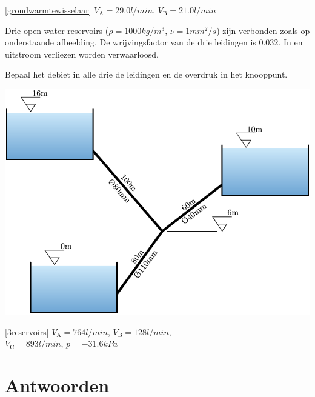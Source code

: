\begin{antwoord}{\ref{grondwarmtewisselaar}}
	$\dot{V}_\mathrm{A} = 29.0 \unit{l/min}$, $\dot{V}_\mathrm{B} = 21.0 \unit{l/min}$
\end{antwoord}
\begin{toepassing}[*]
	\label{3reservoirs}
Drie open water reservoirs ($\rho=1000 \unit{kg/m^3}$, $\nu=1 \unit{mm^2/s}$) zijn verbonden zoals op onderstaande afbeelding. De wrijvingsfactor van de drie leidingen is $0.032$. In en uitstroom verliezen worden verwaarloosd.
		
Bepaal het debiet in alle drie de leidingen en de overdruk in het knooppunt.
		
	\centering
	\includegraphics{fig/leidingstelsels/3reservoirs}
\end{toepassing}
\begin{antwoord}{\ref{3reservoirs}}
		$\dot{V}_\mathrm{A} = 764 \unit{l/min}$, $\dot{V}_\mathrm{B} = 128 \unit{l/min}$,\\
		$\dot{V}_\mathrm{C} = 893 \unit{l/min}$, $p=-31.6 \unit{kPa}$
\end{antwoord}
\section*{Antwoorden}
	\begin{multicols}{2}
	\end{multicols}